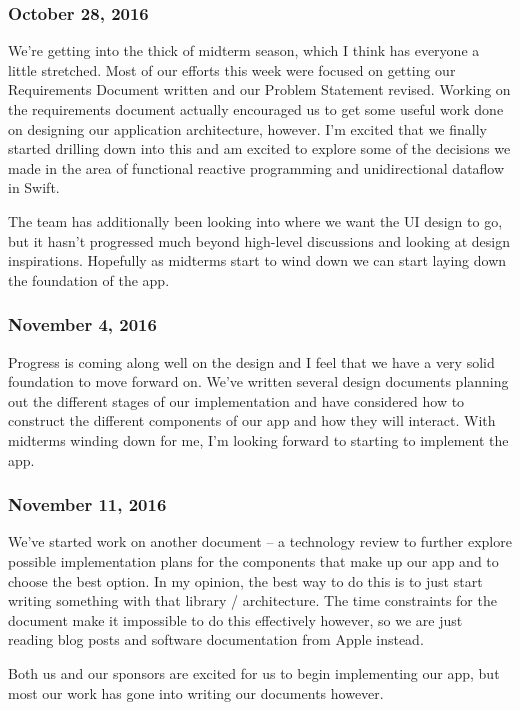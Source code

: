 \subsubsection{October 28, 2016}\label{section}
We're getting into the thick of midterm season, which I think has
everyone a little stretched. Most of our efforts this week were focused
on getting our Requirements Document written and our Problem Statement
revised. Working on the requirements document actually encouraged us to
get some useful work done on designing our application architecture,
however. I'm excited that we finally started drilling down into this and
am excited to explore some of the decisions we made in the area of
functional reactive programming and unidirectional dataflow in Swift.

The team has additionally been looking into where we want the UI design
to go, but it hasn't progressed much beyond high-level discussions and
looking at design inspirations. Hopefully as midterms start to wind down
we can start laying down the foundation of the app.

\subsubsection{November 4, 2016}\label{section}
Progress is coming along well on the design and I feel that we have a
very solid foundation to move forward on. We've written several design
documents planning out the different stages of our implementation and
have considered how to construct the different components of our app and
how they will interact. With midterms winding down for me, I'm looking
forward to starting to implement the app.

\subsubsection{November 11, 2016}\label{section}
We've started work on another document -- a technology review to further
explore possible implementation plans for the components that make up
our app and to choose the best option. In my opinion, the best way to do
this is to just start writing something with that library /
architecture. The time constraints for the document make it impossible
to do this effectively however, so we are just reading blog posts and
software documentation from Apple instead.

Both us and our sponsors are excited for us to begin implementing our
app, but most our work has gone into writing our documents however.

